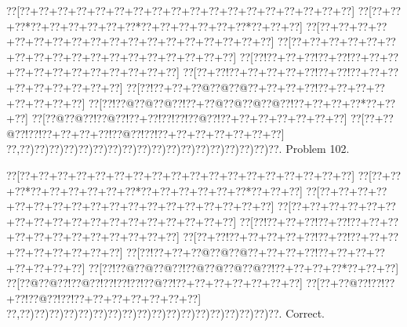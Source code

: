\documentclass[a5paper]{article}
\begin{document}
\begin{center}
{\goo
\0??[\0??+\0??+\0??+\0??+\0??+\0??+\0??+\0??+\0??+\0??+\0??+\0??+\0??+\0??+\0??+\0??+\0??+\0??]
\0??[\0??+\0??+\0??*\0??+\0??+\0??+\0??+\0??+\0??*\0??+\0??+\0??+\0??+\0??+\0??*\0??+\0??+\0??]
\0??[\0??+\0??+\0??+\0??+\0??+\0??+\0??+\0??+\0??+\0??+\0??+\0??+\0??+\0??+\0??+\0??+\0??+\0??]
\0??[\0??+\0??+\0??+\0??+\0??+\0??+\0??+\0??+\0??+\0??+\0??+\0??+\0??+\0??+\0??+\0??+\0??+\0??]
\0??[\0??!\0??+\0??+\0??!\0??+\0??!\0??+\0??+\0??+\0??+\0??+\0??+\0??+\0??+\0??+\0??+\0??+\0??]
\0??[\0??+\0??!\0??+\0??+\0??+\0??+\0??!\0??+\0??!\0??+\0??+\0??+\0??+\0??+\0??+\0??+\0??+\0??]
\0??[\0??!\0??+\0??+\0??@\0??@\0??@\0??+\0??+\0??+\0??!\0??+\0??+\0??+\0??+\0??+\0??+\0??+\0??]
\0??[\0??!\0??@\0??@\0??@\0??!\0??+\0??@\0??@\0??@\0??@\0??!\0??+\0??+\0??+\0??*\0??+\0??+\0??]
\0??[\0??@\0??@\0??!\0??@\0??!\0??+\0??!\0??!\0??!\0??@\0??!\0??+\0??+\0??+\0??+\0??+\0??+\0??]
\0??[\0??+\0??@\0??!\0??!\0??+\0??+\0??+\0??!\0??@\0??!\0??!\0??+\0??+\0??+\0??+\0??+\0??+\0??]
\0??,\0??)\0??)\0??)\0??)\0??)\0??)\0??)\0??)\0??)\0??)\0??)\0??)\0??)\0??)\0??)\0??)\0??)\0??.
}
Problem 102.

\end{center}
\begin{center}
{\goo
\0??[\0??+\0??+\0??+\0??+\0??+\0??+\0??+\0??+\0??+\0??+\0??+\0??+\0??+\0??+\0??+\0??+\0??+\0??]
\0??[\0??+\0??+\0??*\0??+\0??+\0??+\0??+\0??+\0??*\0??+\0??+\0??+\0??+\0??+\0??*\0??+\0??+\0??]
\0??[\0??+\0??+\0??+\0??+\0??+\0??+\0??+\0??+\0??+\0??+\0??+\0??+\0??+\0??+\0??+\0??+\0??+\0??]
\0??[\0??+\0??+\0??+\0??+\0??+\0??+\0??+\0??+\0??+\0??+\0??+\0??+\0??+\0??+\0??+\0??+\0??+\0??]
\0??[\0??!\0??+\0??+\0??!\0??+\0??!\0??+\0??+\0??+\0??+\0??+\0??+\0??+\0??+\0??+\0??+\0??+\0??]
\0??[\0??+\0??!\0??+\0??+\0??+\0??+\0??!\0??+\0??!\0??+\0??+\0??+\0??+\0??+\0??+\0??+\0??+\0??]
\0??[\0??!\0??+\0??+\0??@\0??@\0??@\0??+\0??+\0??+\0??!\0??+\0??+\0??+\0??+\0??+\0??+\0??+\0??]
\0??[\0??!\0??@\0??@\0??@\0??!\0??@\0??@\0??@\0??@\0??!\0??+\0??+\0??+\0??*\0??+\0??+\0??]
\0??[\0??@\0??@\0??!\0??@\0??!\0??!\0??!\0??!\0??@\0??!\0??+\0??+\0??+\0??+\0??+\0??+\0??]
\0??[\0??+\0??@\0??!\0??!\0??+\0??!\0??@\0??!\0??!\0??+\0??+\0??+\0??+\0??+\0??+\0??]
\0??,\0??)\0??)\0??)\0??)\0??)\0??)\0??)\0??)\0??)\0??)\0??)\0??)\0??)\0??)\0??)\0??)\0??)\0??.
}
Correct. 

\end{center}
\end{document}

